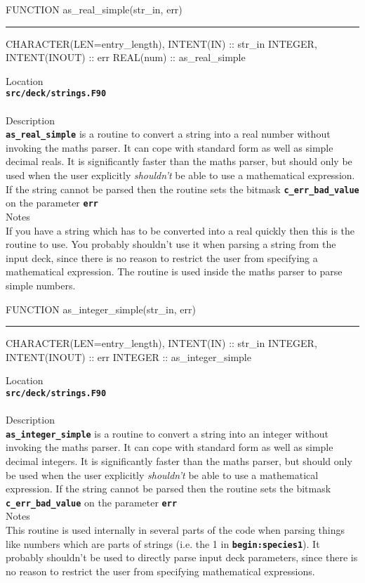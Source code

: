 \documentclass[12pt,a4paper]{article}
\newcommand{\HRule}{\rule[0.3cm]{\linewidth}{0.5mm}}
\newcommand{\inlinecode}[1]{{\color{warwickred} \bf\texttt{#1}}}
\begin{document}
\pagebreak
\begin{codedef}
FUNCTION as_real_simple(str_in, err)
\HRule
CHARACTER(LEN=entry_length), INTENT(IN) :: str_in
INTEGER, INTENT(INOUT) :: err
REAL(num) :: as_real_simple
\end{codedef}
\vspace{1cm}
{\Large Location\\}
\inlinecode{src/deck/strings.F90}\\
\\[0.5cm]
{\Large Description\\}
\inlinecode{as\_real\_simple} is a routine to convert a string into a real
number without invoking the maths parser. It can cope with standard form as
well as simple decimal reals. It is significantly faster than the maths parser,
but should only be used when the user explicitly {\it shouldn't} be able to use
a mathematical expression. If the string cannot be parsed then the routine sets
the bitmask \inlinecode{c\_err\_bad\_value} on the parameter \inlinecode{err}
\\[0.5cm]
{\Large Notes\\}
If you have a string which has to be converted into a real quickly then this is
the routine to use. You probably shouldn't use it when parsing a string from
the input deck, since there is no reason to restrict the user from specifying a
mathematical expression. The routine is used inside the maths parser to parse
simple numbers.

\pagebreak
\begin{codedef}
FUNCTION as_integer_simple(str_in, err)
\HRule
CHARACTER(LEN=entry_length), INTENT(IN) :: str_in
INTEGER, INTENT(INOUT) :: err
INTEGER :: as_integer_simple
\end{codedef}
\vspace{1cm}
{\Large Location\\}
\inlinecode{src/deck/strings.F90}\\
\\[0.5cm]
{\Large Description\\}
\inlinecode{as\_integer\_simple} is a routine to convert a string into an
integer without invoking the maths parser. It can cope with standard form as
well as simple decimal integers. It is significantly faster than the maths
parser, but should only be used when the user explicitly {\it shouldn't} be
able to use a mathematical expression. If the string cannot be parsed then the
routine sets the bitmask \inlinecode{c\_err\_bad\_value} on the parameter
\inlinecode{err}
\\[0.5cm]
{\Large Notes\\}
This routine is used internally in several parts of the code when parsing
things like numbers which are parts of strings (i.e. the 1 in
\inlinecode{begin:species1}). It probably shouldn't be used to directly parse
input deck parameters, since there is no reason to restrict the user from
specifying mathematical expressions.
\end{document}
